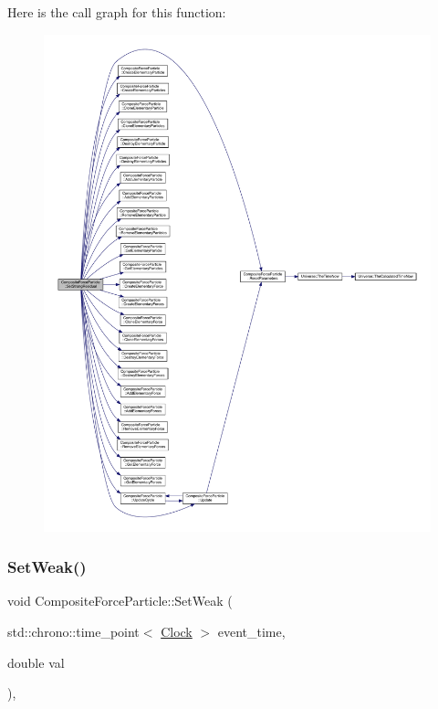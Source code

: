 Here is the call graph for this function\+:
\nopagebreak
\begin{figure}[H]
\begin{center}
\leavevmode
\includegraphics[width=350pt]{class_composite_force_particle_aeba1070d4ec6e52fd8276e38c6a6c2e1_cgraph}
\end{center}
\end{figure}
\mbox{\label{class_composite_force_particle_a7899a6efda98b062051e37c25c214e2a}} 
\subsubsection{\texorpdfstring{Set\+Weak()}{SetWeak()}}
{\footnotesize\ttfamily void Composite\+Force\+Particle\+::\+Set\+Weak (\begin{DoxyParamCaption}\item[{std\+::chrono\+::time\+\_\+point$<$ \hyperlink{universe_8h_a0ef8d951d1ca5ab3cfaf7ab4c7a6fd80}{Clock} $>$}]{event\+\_\+time,  }\item[{double}]{val }\end{DoxyParamCaption})\hspace{0.3cm}{\ttfamily [inline]}, {\ttfamily [virtual]}}



